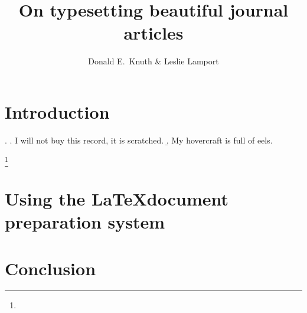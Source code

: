 \documentclass[startpage=1,last]{../jciartcl}
\author{Donald E.\ Knuth \& Leslie Lamport}
\title{On typesetting beautiful journal articles}
\begin{document}
\maketitle

\begin{abstract}
\blindtext
\end{abstract}


\section{Introduction}\label{sec:intro}

\blindtext

\ex.
	\a. I will not buy this record, it is scratched.
	\b. My hovercraft is full of eels.


\blindtext\footnote{\blindtext}


\section{Using the \LaTeX document preparation system}\label{sec:latex}

\Blindtext


\section{Conclusion}\label{sec:concl}

\blindtext


\nocite{*}


\end{document}
